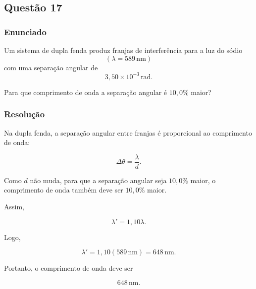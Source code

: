 \subsection{Questão 17}

\subsubsection{Enunciado}

Um sistema de dupla fenda produz franjas de interferência para a luz do sódio 
\[
(\lambda = 589\,\text{nm})
\]
com uma separação angular de
\[
3{,}50 \times 10^{-3}\,\text{rad}.
\]

Para que comprimento de onda a separação angular é \(10{,}0\%\) maior?

\vspace{0.5cm}

\subsubsection{Resolução}

Na dupla fenda, a separação angular entre franjas é proporcional ao comprimento
de onda:

\[
\Delta\theta=\frac{\lambda}{d}.
\]

Como \(d\) não muda, para que a separação angular seja \(10{,}0\%\) maior, o
comprimento de onda também deve ser \(10{,}0\%\) maior.

Assim,

\[
\lambda'=1{,}10\lambda.
\]

Logo,

\[
\lambda'=1{,}10(589\,\text{nm})
=648\,\text{nm}.
\]

Portanto, o comprimento de onda deve ser

\[
\boxed{648\,\text{nm}}.
\]

\vspace{1cm}

